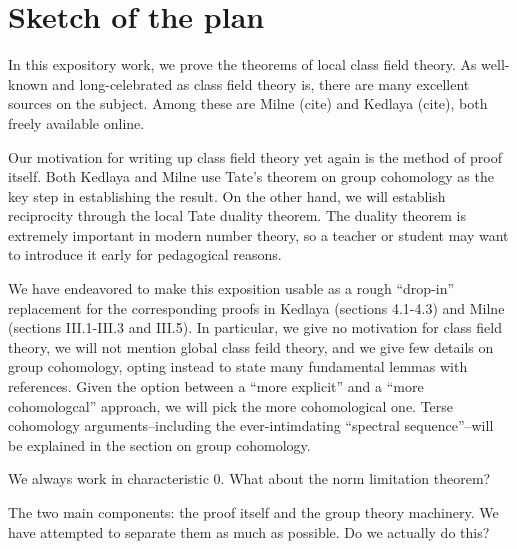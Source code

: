
\section{Sketch of the plan}


In this expository work, we prove the theorems of 
local class field theory. 
As well-known and long-celebrated as class field theory is, 
there are many excellent sources on the subject. 
Among these are Milne (cite) and Kedlaya (cite), both freely
available online. 

Our motivation for writing up class field theory yet again 
is the method
of proof itself. 
Both Kedlaya and Milne use Tate's theorem on group cohomology
as the key step in establishing the result. 
On the other hand, we will establish reciprocity through
the local Tate duality theorem.
The duality theorem is extremely important in modern number
theory, so a teacher or student 
may want to introduce it early for pedagogical reasons.

We have endeavored to make this exposition usable as a 
rough
``drop-in'' replacement for the corresponding proofs 
in Kedlaya (sections 4.1-4.3) and 
Milne (sections III.1-III.3 and III.5).
In particular, we give no motivation for class field 
theory, we will not mention global class feild theory,
and we give few details on group cohomology,
opting instead to state many fundamental lemmas with references.
Given the option between a ``more explicit'' and a
``more cohomologcal'' approach, we will pick the
more cohomological one.
Terse cohomology arguments--including the ever-intimdating
``spectral sequence''--will be explained in the section on
group cohomology.

We always work in characteristic 0.
What about the norm limitation theorem?

The two main components: the proof itself and the group theory
machinery.
We have attempted to separate them as much as possible.
Do we actually do this?

